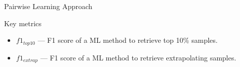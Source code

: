 \documentclass[12pt,pdf,hyperref={unicode}]{beamer}
\begin{document}
\begin{frame}{Pairwise Learning Approach}
\begin{minipage}[t]{0.52\textwidth}
\begin{center}
        \end{center}
        \vfill
        \begin{block}{\small Key metrics}
            \footnotesize
            \begin{itemize}
                \item $f1_{top10}$ --- F1 score of a ML method to retrieve top 10\% samples.
                \item $f1_{extrap}$ --- F1 score of a ML method to retrieve extrapolating samples.
            \end{itemize}
        \end{block}
    \end{minipage}
\end{frame}
\end{document}
